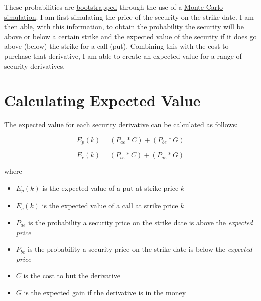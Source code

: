 \documentclass[
]{book}
\providecommand{\tightlist}{%
  \setlength{\itemsep}{0pt}\setlength{\parskip}{0pt}}
\begin{document}
These probabilities are \protect\hyperlink{link-to-bootstrap}{bootstrapped} through the use of a
\protect\hyperlink{link-to-mc}{Monte Carlo simulation}. I am first simulating the price of the
security on the strike date. I am then able, with this information, to obtain
the probability the security will be above or below a certain strike and the
expected value of the security if it does go above (below) the strike for a call
(put). Combining this with the cost to purchase that derivative, I am able to
create an expected value for a range of security derivatives.

\hypertarget{ev}{%
\chapter{Calculating Expected Value}\label{ev}}

The expected value for each security derivative can be calculated as follows:

\begin{equation} 
E_p(k) = (P_{ae} * C) + (P_{be} * G)
\label{eq:puts}
\end{equation}

\begin{equation} 
E_c(k) = (P_{be} * C) + (P_{ae} * G)
\label{eq:calls}
\end{equation}

where

\begin{itemize}
\tightlist
\item
  \(E_p(k)\) is the expected value of a put at strike price \(k\)
\item
  \(E_c(k)\) is the expected value of a call at strike price \(k\)
\item
  \(P_{ae}\) is the probability a security price on the strike date is above the
  \emph{expected price}
\item
  \(P_{be}\) is the probability a security price on the strike date is below the
  \emph{expected price}
\item
  \(C\) is the cost to but the derivative
\item
  \(G\) is the expected gain if the derivative is in the money
\end{itemize}
\end{document}
